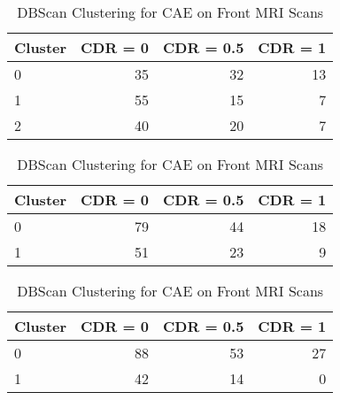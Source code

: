 \begin{table}[h] \centering
\begin{minipage}{0.3\textwidth}

\begin{tabular}{lrrr}
\toprule
Cluster & CDR = 0 & CDR = 0.5 & CDR = 1\\
\midrule
0 & 35 & 32 & 13\\
1 & 55 & 15 & 7\\
2 & 40 & 20 & 7\\
\bottomrule
\end{tabular}
\caption{Kmeans Clustering with 3 Clusters for CAE on Front MRI Scans}
\end{minipage}
\hspace{3cm}
\begin{minipage}{0.3\textwidth}

\begin{tabular}{lrrr}
\toprule
Cluster & CDR = 0 & CDR = 0.5 & CDR = 1\\
\midrule
0 & 79 & 44 & 18\\
1 & 51 & 23 & 9\\
\bottomrule
\end{tabular}
\caption{Kmeans Clustering with 2 Clusters for CAE on Front MRI Scans}
\end{minipage}
\hspace{3cm}
\begin{minipage}{0.3\textwidth}

\begin{tabular}{lrrr}
\toprule
Cluster & CDR = 0 & CDR = 0.5 & CDR = 1\\
\midrule
0 & 88 & 53 & 27\\
1 & 42 & 14 & 0\\
\bottomrule
\end{tabular}
\caption{DBScan Clustering for CAE on Front MRI Scans}
\end{minipage}
\end{table}
